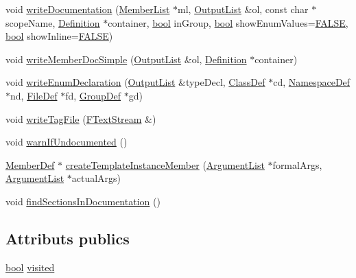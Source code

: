 \begin{DoxyCompactItemize}
\item 
void \hyperlink{class_member_def_a480c55edf3118c9e657d3aa4eecf841b}{write\+Documentation} (\hyperlink{class_member_list}{Member\+List} $\ast$ml, \hyperlink{class_output_list}{Output\+List} \&ol, const char $\ast$scope\+Name, \hyperlink{class_definition}{Definition} $\ast$container, \hyperlink{qglobal_8h_a1062901a7428fdd9c7f180f5e01ea056}{bool} in\+Group, \hyperlink{qglobal_8h_a1062901a7428fdd9c7f180f5e01ea056}{bool} show\+Enum\+Values=\hyperlink{qglobal_8h_a10e004b6916e78ff4ea8379be80b80cc}{F\+A\+L\+S\+E}, \hyperlink{qglobal_8h_a1062901a7428fdd9c7f180f5e01ea056}{bool} show\+Inline=\hyperlink{qglobal_8h_a10e004b6916e78ff4ea8379be80b80cc}{F\+A\+L\+S\+E})
\item 
void \hyperlink{class_member_def_a47f1fedac5c58286f964c962632463a7}{write\+Member\+Doc\+Simple} (\hyperlink{class_output_list}{Output\+List} \&ol, \hyperlink{class_definition}{Definition} $\ast$container)
\item 
void \hyperlink{class_member_def_a4dd1663d4ed8cf3a66b2d07d1a63004b}{write\+Enum\+Declaration} (\hyperlink{class_output_list}{Output\+List} \&type\+Decl, \hyperlink{class_class_def}{Class\+Def} $\ast$cd, \hyperlink{class_namespace_def}{Namespace\+Def} $\ast$nd, \hyperlink{class_file_def}{File\+Def} $\ast$fd, \hyperlink{class_group_def}{Group\+Def} $\ast$gd)
\item 
void \hyperlink{class_member_def_a5cfb05e51756a06155166664c3d1854d}{write\+Tag\+File} (\hyperlink{class_f_text_stream}{F\+Text\+Stream} \&)
\item 
void \hyperlink{class_member_def_abc7ce1039808b770b1a283cc2aafb713}{warn\+If\+Undocumented} ()
\item 
\hyperlink{class_member_def}{Member\+Def} $\ast$ \hyperlink{class_member_def_a89bb4168f71a20ce3c80cbe086b9115c}{create\+Template\+Instance\+Member} (\hyperlink{class_argument_list}{Argument\+List} $\ast$formal\+Args, \hyperlink{class_argument_list}{Argument\+List} $\ast$actual\+Args)
\item 
void \hyperlink{class_member_def_a39101ee7126058a7923d89ae02a10ff0}{find\+Sections\+In\+Documentation} ()
\end{DoxyCompactItemize}
\subsection*{Attributs publics}
\begin{DoxyCompactItemize}
\item 
\hyperlink{qglobal_8h_a1062901a7428fdd9c7f180f5e01ea056}{bool} \hyperlink{class_member_def_ac5036da555a368084602330c51727cec}{visited}
\end{DoxyCompactItemize}
